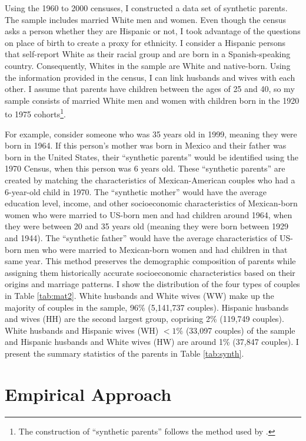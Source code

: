 Using the 1960 to 2000 censuses, I constructed a data set of synthetic parents. The sample includes married White men and women. Even though the census asks a person whether they are Hispanic or not, I took advantage of the questions on place of birth to create a proxy for ethnicity. I consider a Hispanic persons that self-report White as their racial group and are born in a Spanish-speaking country. Consequently, Whites in the sample are White and native-born. Using the information provided in the census, I can link husbands and wives with each other. I assume that parents have children between the ages of 25 and 40, so my sample consists of married White men and women with children born in the 1920 to 1975 cohorts\footnote{The construction of ``synthetic parents'' follows the method used by \textcite{rubinstein2014pride}.}.

For example, consider someone who was 35 years old in 1999, meaning they were born in 1964. If this person's mother was born in Mexico and their father was born in the United States, their ``synthetic parents'' would be identified using the 1970 Census, when this person was 6 years old. These ``synthetic parents'' are created by matching the characteristics of Mexican-American couples who had a 6-year-old child in 1970. The ``synthetic mother'' would have the average education level, income, and other socioeconomic characteristics of Mexican-born women who were married to US-born men and had children around 1964, when they were between 20 and 35 years old (meaning they were born between 1929 and 1944). The ``synthetic father'' would have the average characteristics of US-born men who were married to Mexican-born women and had children in that same year. This method preserves the demographic composition of parents while assigning them historically accurate socioeconomic characteristics based on their origins and marriage patterns.
I show the distribution of the four types of couples in Table \ref{tab:mat2}. White husbands and White wives (WW) make up the majority of couples in the sample, 96\% (5,141,737 couples). Hispanic husbands and wives (HH) are the second largest group, coprising 2\% (119,749 couples). White husbands and Hispanic wives (WH) $< 1\%$ (33,097 couples) of the sample and Hispanic husbands and White wives (HW) are around 1\% (37,847 couples). I present the summary statistics of the parents in Table \ref{tab:synth}.

\section{Empirical Approach}\label{sec:emp_model}

